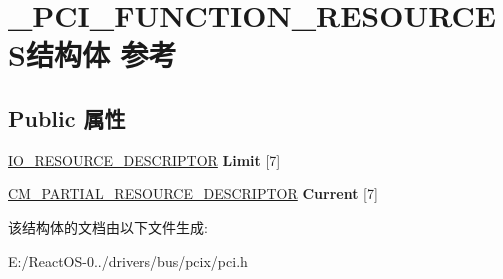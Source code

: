 \hypertarget{struct___p_c_i___f_u_n_c_t_i_o_n___r_e_s_o_u_r_c_e_s}{}\section{\+\_\+\+P\+C\+I\+\_\+\+F\+U\+N\+C\+T\+I\+O\+N\+\_\+\+R\+E\+S\+O\+U\+R\+C\+E\+S结构体 参考}
\label{struct___p_c_i___f_u_n_c_t_i_o_n___r_e_s_o_u_r_c_e_s}
\subsection*{Public 属性}
\begin{DoxyCompactItemize}
\item 
\mbox{\label{struct___p_c_i___f_u_n_c_t_i_o_n___r_e_s_o_u_r_c_e_s_a451c7e49b7734e8f472cfc3fb7294ad3}} 
\hyperlink{struct___i_o___r_e_s_o_u_r_c_e___d_e_s_c_r_i_p_t_o_r}{I\+O\+\_\+\+R\+E\+S\+O\+U\+R\+C\+E\+\_\+\+D\+E\+S\+C\+R\+I\+P\+T\+OR} {\bfseries Limit} \mbox{[}7\mbox{]}
\item 
\mbox{\label{struct___p_c_i___f_u_n_c_t_i_o_n___r_e_s_o_u_r_c_e_s_a9488f9e3ac3c1142ca15ff07d37905f8}} 
\hyperlink{struct___c_m___p_a_r_t_i_a_l___r_e_s_o_u_r_c_e___d_e_s_c_r_i_p_t_o_r}{C\+M\+\_\+\+P\+A\+R\+T\+I\+A\+L\+\_\+\+R\+E\+S\+O\+U\+R\+C\+E\+\_\+\+D\+E\+S\+C\+R\+I\+P\+T\+OR} {\bfseries Current} \mbox{[}7\mbox{]}
\end{DoxyCompactItemize}


该结构体的文档由以下文件生成\+:\begin{DoxyCompactItemize}
\item 
E\+:/\+React\+O\+S-\/0../drivers/bus/pcix/pci.\+h\end{DoxyCompactItemize}

